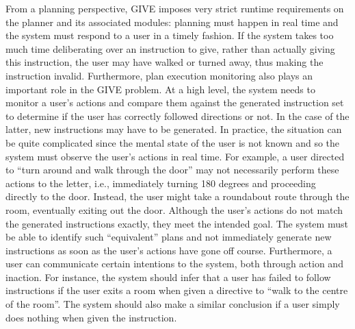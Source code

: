 From a planning perspective, GIVE imposes very strict runtime requirements
on the planner and its associated modules: planning must happen in real
time and the system must respond to a user in a timely fashion.  If the
system takes too much time deliberating over an instruction to give, rather
than actually giving this instruction, the user may have walked or turned
away, thus making the instruction invalid.  Furthermore, plan execution
monitoring also plays an important role in the GIVE problem.  At a high
level, the system needs to monitor a user's actions and compare them
against the generated instruction set to determine if the user has
correctly followed directions or not. In the case of the latter, new
instructions may have to be generated. In practice, the situation can be
quite complicated since the mental state of the user is not known and so
the system must observe the user's actions in real time. For example, a
user directed to ``turn around and walk through the door'' may not
necessarily perform these actions to the letter, i.e., immediately turning
180 degrees and proceeding directly to the door. Instead, the user might
take a roundabout route through the room, eventually exiting out the door.
Although the user's actions do not match the generated instructions
exactly, they meet the intended goal. The system must be able to identify
such ``equivalent'' plans and not immediately generate new instructions as
soon as the user's actions have gone off course. Furthermore, a user can
communicate certain intentions to the system, both through action and
inaction. For instance, the system should infer that a user has failed to
follow instructions if the user exits a room when given a directive to
``walk to the centre of the room''. The system should also make a
similar conclusion if a user simply does nothing when given the
instruction.


